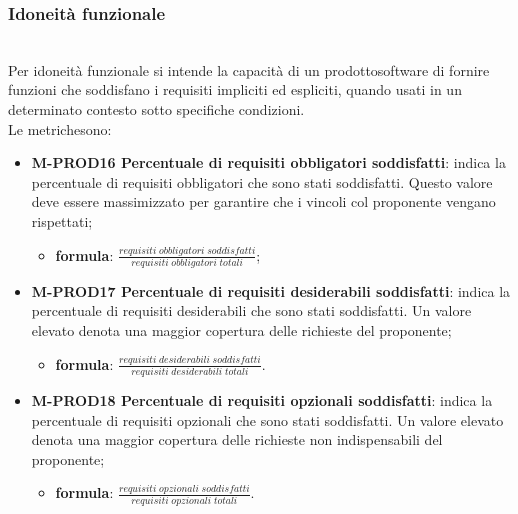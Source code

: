 		\subsubsection{Idoneità funzionale} \mbox{}\\[1mm]
		Per idoneità funzionale si intende la capacità di un prodotto\glosp software di fornire funzioni che soddisfano i requisiti impliciti ed espliciti, quando usati in un determinato contesto sotto specifiche condizioni. \\
		Le metriche\glosp sono:
		\begin{itemize}
			\item \textbf{M-PROD16 Percentuale di requisiti obbligatori soddisfatti}: indica la percentuale di requisiti obbligatori che sono stati soddisfatti. Questo valore deve essere massimizzato per garantire che i vincoli col proponente vengano rispettati;
			\begin{itemize}
				\item[] \textbf{formula}: $\frac{requisiti \; obbligatori \; soddisfatti}{requisiti \; obbligatori \; totali}$;
			\end{itemize} 
			\item \textbf{M-PROD17 Percentuale di requisiti desiderabili soddisfatti}:
			indica la percentuale di requisiti desiderabili che sono stati soddisfatti. Un valore elevato denota una maggior copertura delle richieste del proponente;
			\begin{itemize}
				\item[] \textbf{formula}: $\frac{requisiti \; desiderabili \; soddisfatti}{requisiti \; desiderabili \; totali}$.
			\end{itemize} 
			\item \textbf{M-PROD18 Percentuale di requisiti opzionali soddisfatti}:
			indica la percentuale di requisiti opzionali che sono stati soddisfatti. Un valore elevato denota una maggior copertura delle richieste non indispensabili  del proponente;
			\begin{itemize}
				\item[] \textbf{formula}: $\frac{requisiti \; opzionali \; soddisfatti}{requisiti \; opzionali \; totali}$.
			\end{itemize} 
		\end{itemize}
	
